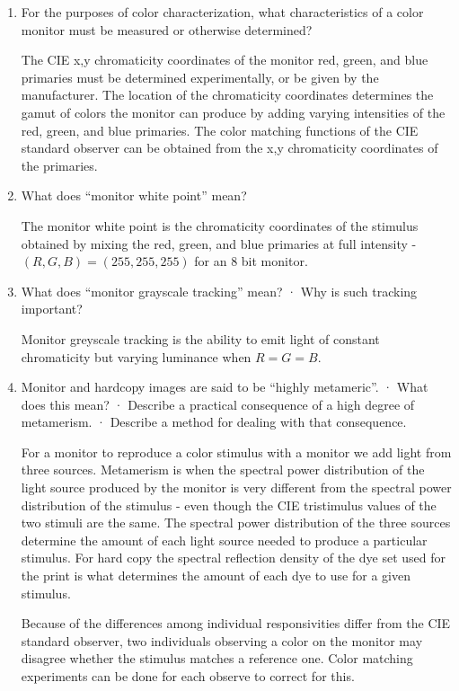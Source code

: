 \begin{enumerate}
\item For the purposes of color characterization, what
characteristics of a color monitor must be measured or otherwise
determined?

\par The CIE x,y chromaticity coordinates of the monitor red, green, and
blue primaries must be determined experimentally, or be given by
the manufacturer.  The location of the chromaticity coordinates
determines the gamut of colors the monitor can produce by adding
varying intensities of the red, green, and blue primaries. The
color matching functions of the CIE standard observer can be
obtained from the x,y chromaticity coordinates of the primaries.

\item What does “monitor white point” mean?

\par The monitor white point is the chromaticity coordinates
of the stimulus obtained by mixing the red, green, and blue
primaries at full intensity - $ (R,G,B)=(255,255,255) $ for an 8
bit monitor.

\item What does “monitor grayscale tracking” mean?
 · Why is such tracking important?
 \par Monitor greyscale tracking is the ability to emit light of
 constant chromaticity but varying luminance when $R=G=B$.

\item Monitor and hardcopy images are said to be “highly
metameric”.
 · What does this mean?
 · Describe a practical consequence of a high degree of metamerism.
 · Describe a method for dealing with that consequence.
\par For a monitor to reproduce a color stimulus with a monitor we add light
from three sources.    Metamerism is when the spectral power
distribution of the light source produced by the monitor is very
different from the spectral power distribution of the stimulus -
even though the CIE tristimulus values of the two stimuli are the
same.  The spectral power distribution of the three sources
determine the amount of each light source needed to produce a
particular stimulus.  For hard copy the spectral reflection
density of the dye set used for the print is what determines the
amount of each dye to use for a given stimulus.

Because of the differences among individual responsivities differ
from the CIE standard observer, two individuals observing a color
on the monitor may disagree whether the stimulus matches a
reference one.  Color matching experiments can be done for each
observe to correct for this.


\end{enumerate}
